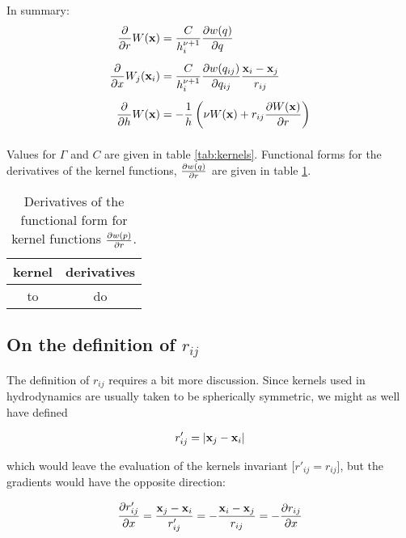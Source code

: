 In summary:
\begin{align*}
	\frac{\partial}{\partial r} W (\mathbf{x}) 
			&= \frac{C}{h_i^{\nu + 1}} \frac{\partial w(q)}{\partial q} \\[.5em]
	\frac{\partial}{\partial x} W_j(\mathbf{x}_i) 
			&= \frac{C}{h_i^{\nu + 1}} \frac{\partial w(q_{ij})}{\partial q_{ij}}  \frac{\mathbf{x}_i - \mathbf{x}_j}{r_{ij}}\\[.5em]
 	\frac{\partial}{\partial h} W(\mathbf{x}) 
 			&= - \frac{1}{h} \left( \nu W(\mathbf{x}) + r_{ij}  \frac{\partial W(\mathbf{x})}{\partial r} \right) \\[.5em]
\end{align*}


Values for $\Gamma$ and $C$ are given in table \ref{tab:kernels}.
Functional forms for the derivatives of the kernel functions, $\frac{\partial w(q)}{\partial r}$ are given in table \ref{tab:kernel-derivatives}.


\begin{table}
\caption{
	\label{tab:kernel-derivatives}
	Derivatives of the functional form for kernel functions $\frac{\partial w(p)}{\partial r}$.
}
\centering

\begin{tabular}{|c|c|}
\hline 
kernel & derivatives \\ 
\hline 
to & do \\ 
\hline 
\end{tabular} 
\end{table}









\subsection{On the definition of $r_{ij}$}


The definition of $r_{ij}$ requires a bit more discussion.
Since kernels used in hydrodynamics are usually taken to be spherically symmetric, we might as well have defined

\begin{align*}
r'_{ij} = |\mathbf{x}_j - \mathbf{x}_i |
\end{align*}

which would leave the evaluation of the kernels invariant [$r'_{ij} = r_{ij}$], but the gradients would have the opposite direction:

\begin{align*}
\frac{\partial r'_{ij}}{\partial x}	
=   \frac{\mathbf{x}_j - \mathbf{x}_i}{r'_{ij}} 
= - \frac{\mathbf{x}_i - \mathbf{x}_j}{r_{ij}}
= - \frac{\partial r_{ij}}{\partial x}
\end{align*}

